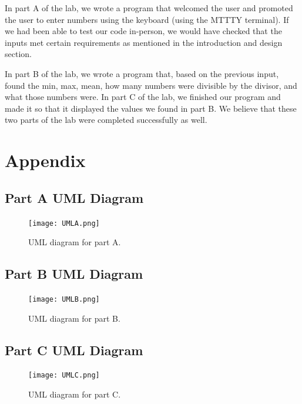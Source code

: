 \documentclass[10pt, letterpaper, titlepage]{article} %
\begin{document}
\begin{multicols*}{2}
In part A of the lab, we wrote a program that welcomed the user and promoted the user to enter numbers using the keyboard (using the MTTTY terminal). 
If we had been able to test our code in-person, we would have checked that the inputs met certain requirements as mentioned in the introduction and design section. 

In part B of the lab, we wrote a program that, based on the previous input, found the min, max, mean, how many numbers were divisible by the divisor, and what those numbers were. 
In part C of the lab, we finished our program and made it so that it displayed the values we found in part B. 
We believe that these two parts of the lab were completed successfully as well. 

\end{multicols*}

\newpage

\section{Appendix}

\subsection{Part A UML Diagram}
\begin{figure}[H]
   \texttt{[image: UMLA.png]}
   \centering  
   \caption{UML diagram for part A.} 
   \label{figure:1}
\end{figure}

\subsection{Part B UML Diagram}
\begin{figure}[H]
   \texttt{[image: UMLB.png]}
   \centering  
   \caption{UML diagram for part B.} 
   \label{figure:2}
\end{figure}

\subsection{Part C UML Diagram}
\begin{figure}[H]
   \texttt{[image: UMLC.png]}
   \centering  
   \caption{UML diagram for part C.} 
   \label{figure:3}
\end{figure}

\newpage
\end{document}
